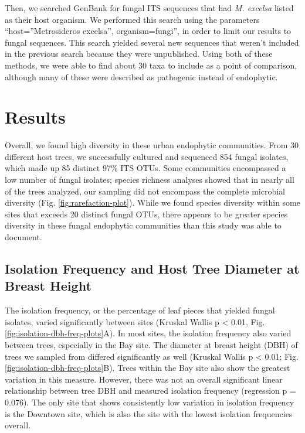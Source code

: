 \documentclass[fleqn,10pt,lineno]{wlpeerj} %
\begin{document}
Then, we searched GenBank for fungal ITS sequences that had \emph{M. excelsa} listed as their host organism. We performed this search using the parameters ``host=''Metrosideros excelsa'', organism=fungi'', in order to limit our results to fungal sequences. This search yielded several new sequences that weren't included in the previous search because they were unpublished. Using both of these methods, we were able to find about 30 taxa to include as a point of comparison, although many of these were described as pathogenic instead of endophytic.

\hypertarget{results}{%
\section*{Results}\label{results}}

Overall, we found high diversity in these urban endophytic communities. From 30 different host trees, we successfully cultured and sequenced 854 fungal isolates, which made up 85 distinct 97\% ITS OTUs. Some communities encompassed a low number of fungal isolates; species richness analyses showed that in nearly all of the trees analyzed, our sampling did not encompass the complete microbial diversity (Fig. \ref{fig:rarefaction-plot}). While we found species diversity within some sites that exceeds 20 distinct fungal OTUs, there appears to be greater species diversity in these fungal endophytic communities than this study was able to document.

\hypertarget{isolation-frequency-and-host-tree-diameter-at-breast-height}{%
\subsection*{Isolation Frequency and Host Tree Diameter at Breast Height}\label{isolation-frequency-and-host-tree-diameter-at-breast-height}}

The isolation frequency, or the percentage of leaf pieces that yielded fungal isolates, varied significantly between sites (Kruskal Wallis p \textless{} 0.01, Fig. \ref{fig:isolation-dbh-freq-plots}A). In most sites, the isolation frequency also varied between trees, especially in the Bay site. The diameter at breast height (DBH) of trees we sampled from differed significantly as well (Kruskal Wallis p \textless{} 0.01; Fig. \ref{fig:isolation-dbh-freq-plots}B). Trees within the Bay site also show the greatest variation in this measure. However, there was not an overall significant linear relationship between tree DBH and measured isolation frequency (regression p = 0.076). The only site that shows consistently low variation in isolation frequency is the Downtown site, which is also the site with the lowest isolation frequencies overall.
\end{document}

